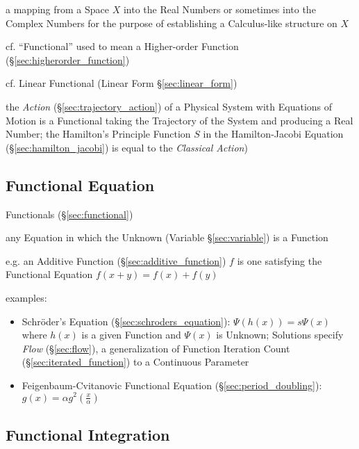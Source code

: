 a mapping from a Space $X$ into the Real Numbers or sometimes into the Complex
Numbers for the purpose of establishing a Calculus-like structure on $X$

\fist cf. ``Functional'' used to mean a Higher-order Function
(\S\ref{sec:higherorder_function})

\fist cf. Linear Functional (Linear Form \S\ref{sec:linear_form})

the \emph{Action} (\S\ref{sec:trajectory_action}) of a Physical System with
Equations of Motion is a Functional taking the Trajectory of the System and
producing a Real Number; the Hamilton's Principle Function $S$ in the
Hamilton-Jacobi Equation (\S\ref{sec:hamilton_jacobi}) is equal to the
\emph{Classical Action})



\subsection{Functional Equation}\label{sec:functional_equation}


Functionals (\S\ref{sec:functional})

any Equation in which the Unknown (Variable \S\ref{sec:variable}) is a Function

e.g. an Additive Function (\S\ref{sec:additive_function}) $f$ is one satisfying
the Functional Equation $f(x + y) = f(x) + f(y)$


examples:
\begin{itemize}
  \item Schr\"oder's Equation (\S\ref{sec:schroders_equation}): $\Psi(h(x)) =
    s\Psi(x)$ where $h(x)$ is a given Function and $\Psi(x)$ is Unknown;
    Solutions specify \emph{Flow} (\S\ref{sec:flow}), a generalization of
    Function Iteration Count (\S\ref{sec:iterated_function}) to a Continuous
    Parameter
  \item Feigenbaum-Cvitanovic Functional Equation (\S\ref{sec:period_doubling}):
    $g(x) = \alpha g^2(\frac{x}{\alpha})$
\end{itemize}



\subsection{Functional Integration}\label{sec:functional_integration}

